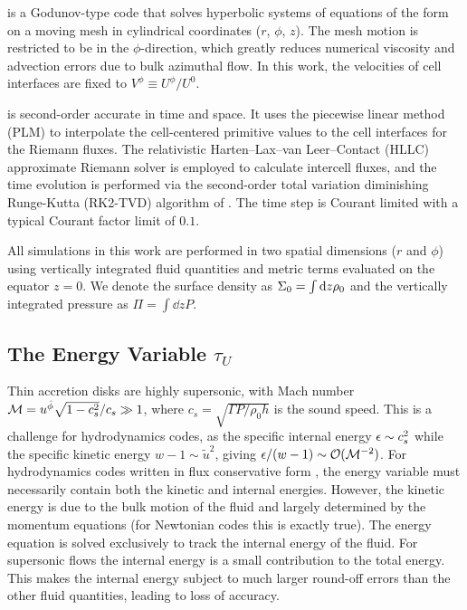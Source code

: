 \Disco{} is a Godunov-type code that solves hyperbolic systems of equations of the form  on a moving mesh in cylindrical coordinates ($r$, $\phi$, $z$).  The mesh motion is restricted to be in the $\phi$-direction, which greatly reduces numerical viscosity and advection errors due to bulk azimuthal flow.  In this work, the velocities of cell interfaces are fixed to $V^\phi \equiv U^\phi/U^0$.   

\Disco{} is second-order accurate in time and space.  It uses the piecewise linear method (PLM) to interpolate the cell-centered primitive values to the cell interfaces for the Riemann fluxes.  The relativistic Harten--Lax--van Leer--Contact (HLLC) approximate Riemann solver \citep{Mignone05} is employed to calculate intercell fluxes, and the time evolution is performed via the second-order total variation diminishing Runge-Kutta (RK2-TVD) algorithm of \cite{Gottlieb98}.  The time step is Courant limited with a typical Courant factor limit of $0.1$.

All simulations in this work are performed in two spatial dimensions ($r$ and $\phi$) using vertically integrated fluid quantities and metric terms evaluated on the equator $z=0$.  We denote the surface density as $\Sigma_0 = \int \mathrm{d} z \rho_0$ and the vertically integrated pressure as $\Pi = \int \dd z P$.  


\subsection{The Energy Variable $\tau_U$}


Thin accretion disks are highly supersonic, with Mach number $\mathcal{M} = u^{\hat{\phi}} \sqrt{1-c_s^2}/c_s \gg 1$, where $c_s = \sqrt{\Gamma P / \rho_0 h}$ is the sound speed.  This is a challenge for hydrodynamics codes, as the specific internal energy $\epsilon \sim c_s^2$ while the specific kinetic energy $w-1 \sim \tilde{u}^2$, giving $\epsilon / (w-1) \sim \mathcal{O}(\mathcal{M}^{-2})$.  For hydrodynamics codes written in flux conservative form , the energy variable must necessarily contain both the kinetic and internal energies.  However, the kinetic energy is due to the bulk motion of the fluid and largely determined by the momentum equations (for Newtonian codes this is exactly true).  The energy equation is solved exclusively to track the internal energy of the fluid. For supersonic flows the internal energy is a small contribution to the total energy.  This makes the internal energy subject to much larger round-off errors than the other fluid quantities, leading to loss of accuracy.

